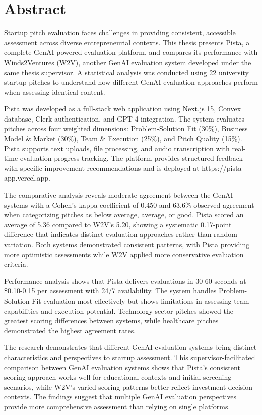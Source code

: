 \chapter*{Abstract}
Startup pitch evaluation faces challenges in providing consistent, accessible assessment across diverse entrepreneurial contexts. This thesis presents Pista, a complete GenAI-powered evaluation platform, and compares its performance with Winds2Ventures (W2V), another GenAI evaluation system developed under the same thesis supervisor. A statistical analysis was conducted using 22 university startup pitches to understand how different GenAI evaluation approaches perform when assessing identical content.

Pista was developed as a full-stack web application using Next.js 15, Convex database, Clerk authentication, and GPT-4 integration. The system evaluates pitches across four weighted dimensions: Problem-Solution Fit (30\%), Business Model \& Market (30\%), Team \& Execution (25\%), and Pitch Quality (15\%). Pista supports text uploads, file processing, and audio transcription with real-time evaluation progress tracking. The platform provides structured feedback with specific improvement recommendations and is deployed at https://pista-app.vercel.app.

The comparative analysis reveals moderate agreement between the GenAI systems with a Cohen's kappa coefficient of 0.450 and 63.6\% observed agreement when categorizing pitches as below average, average, or good. Pista scored an average of 5.36 compared to W2V's 5.20, showing a systematic 0.17-point difference that indicates distinct evaluation approaches rather than random variation. Both systems demonstrated consistent patterns, with Pista providing more optimistic assessments while W2V applied more conservative evaluation criteria.

Performance analysis shows that Pista delivers evaluations in 30-60 seconds at \$0.10-0.15 per assessment with 24/7 availability. The system handles Problem-Solution Fit evaluation most effectively but shows limitations in assessing team capabilities and execution potential. Technology sector pitches showed the greatest scoring differences between systems, while healthcare pitches demonstrated the highest agreement rates.

The research demonstrates that different GenAI evaluation systems bring distinct characteristics and perspectives to startup assessment. This supervisor-facilitated comparison between GenAI evaluation systems shows that Pista's consistent scoring approach works well for educational contexts and initial screening scenarios, while W2V's varied scoring patterns better reflect investment decision contexts. The findings suggest that multiple GenAI evaluation perspectives provide more comprehensive assessment than relying on single platforms.

